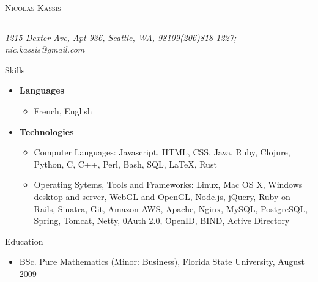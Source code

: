 \documentclass[10pt,oneside]{article}
\makeatletter
\newcommand{\name}{Nicolas Kassis}
\newcommand{\addr}{1215 Dexter Ave, Apt 936, Seattle, WA, 98109}
\newcommand{\phone}{(206)818-1227}
\newcommand{\email}{nic.kassis@gmail.com}
\newcommand{\bigname}[1]{
  \begin{center}\fontfamily{phv}\selectfont\Huge\scshape#1\end{center}
}
\newenvironment{ressection}[1]{
  \vspace{4pt}
	 {\fontfamily{phv}\selectfont\Large#1}
	 \begin{itemize}
	   \vspace{3pt}
}{
	 \end{itemize}
}
\newcommand{\resitem}[1]{
  \vspace{-4pt}
\item \begin{flushleft} #1 \end{flushleft}
}
\newcommand{\ressubitem}[1]{
  \vspace{-1pt}
\item \begin{flushleft} #1 \end{flushleft}
}
\newenvironment{reslist}[1]{
  \resitem{\textbf{#1}}
  \vspace{-5pt}
  \begin{itemize}
}{
  \end{itemize}
}
\makeatother
\begin{document}
 \selectfont

\bigname{\name}
\vspace{-8pt} \rule{\textwidth}{1pt}
\vspace{-1pt} {\small\itshape \addr \hfill \phone; \email}
\vspace{8 pt}

\begin{ressection}{Skills}
  \begin{reslist}{Languages}
    \ressubitem{French, English}
   \end{reslist}
   \begin{reslist}{Technologies}
    \ressubitem{Computer Languages: Javascript, HTML, CSS, Java, Ruby, Clojure, Python, C, C++, Perl, Bash,  SQL, \LaTeX, Rust}
    \ressubitem{Operating Sytems, Tools and Frameworks: Linux, Mac OS X, Windows desktop and server, WebGL and OpenGL,  Node.js, jQuery, Ruby on Rails, Sinatra, Git, Amazon AWS, Apache, Nginx, MySQL, PostgreSQL, Spring, Tomcat, Netty, 0Auth 2.0, OpenID, BIND, Active Directory}
    \end{reslist}
\end{ressection}
\begin{ressection}{Education}
  \ressubitem{BSc. Pure Mathematics (Minor: Business), Florida State University, August 2009}
\end{ressection}
\end{document}
